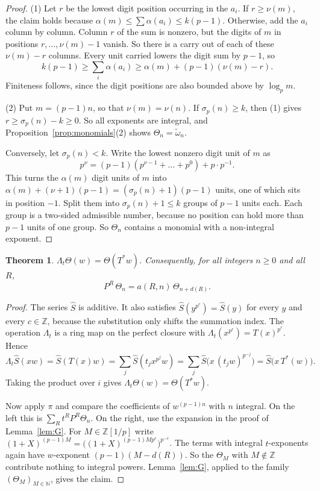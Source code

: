 \documentclass[11pt]{amsart}
\newtheorem{theorem}{Theorem}[section]
\theoremstyle{definition}
\theoremstyle{remark}
\newcommand{\wt}{\widetilde{\omega}}
\begin{document}
\begin{proof}
(1) Let $r$ be the lowest digit position occurring in the $a_i$.  If
$r\ge\nu(m)$, the claim holds because $\alpha(m)\le\sum\alpha(a_i)\le k(p-1)$.
Otherwise, add the $a_i$ column by column.  Column $r$ of the sum is nonzero,
but the digits of $m$ in positions $r,\dots,\nu(m)-1$ vanish.  So there is a
carry out of each of these $\nu(m)-r$ columns.  Every unit carried lowers the
digit sum by $p-1$, so
\[
  k(p-1)\ge\sum_i\alpha(a_i)\ge\alpha(m)+(p-1)(\nu(m)-r).
\]
Finiteness follows, since the digit positions are also bounded above by
$\log_pm$.

(2) Put $m=(p-1)n$, so that $\nu(m)=\nu(n)$.  If $\sigma_p(n)\ge k$, then (1)
gives $r\ge\sigma_p(n)-k\ge0$.  So all exponents are integral, and
Proposition~\ref{prop:monomials}(2) shows $\Theta_n=\wt_n$.

Conversely, let $\sigma_p(n)<k$.  Write the lowest nonzero digit unit of $m$ as
\[
  p^{\nu}=(p-1)(p^{\nu-1}+\dots+p^0)+p\cdot p^{-1}.
\]
This turns the $\alpha(m)$ digit units of $m$ into
$\alpha(m)+(\nu+1)(p-1)=(\sigma_p(n)+1)(p-1)$ units, one of which sits in
position $-1$.  Split them into $\sigma_p(n)+1\le k$ groups of $p-1$ units
each.  Each group is a two-sided admissible number, because no position can
hold more than $p-1$ units of one group.  So $\Theta_n$ contains a monomial
with a non-integral exponent.
\end{proof}

\begin{theorem}\label{thm:twoaction}
$\Lambda_t\Theta(w)=\Theta(T^*w)$.  Consequently, for all integers $n\ge0$
and all $R$,
\[
  P^R\,\Theta_n=a(R,n)\,\Theta_{n+d(R)} .
\]
\end{theorem}

\begin{proof}
The series $\widehat S$ is additive.  It also satisfies
$\widehat S(y^{p^c})=\widehat S(y)$ for every $y$ and every $c\in\mathbb{Z}$,
because the substitution only shifts the summation index.  The operation
$\Lambda_t$ is a ring map on the perfect closure with
$\Lambda_t(x^{p^r})=T(x)^{p^r}$.  Hence
\[
  \Lambda_t\widehat S(xw)=\widehat S(T(x)w)=\sum_j\widehat S(t_jx^{p^j}w)
  =\sum_j\widehat S\bigl(x\,(t_jw)^{p^{-j}}\bigr)=\widehat S\bigl(x\,T^*(w)\bigr).
\]
Taking the product over $i$ gives $\Lambda_t\Theta(w)=\Theta(T^*w)$.

Now apply $\pi$ and compare the coefficients of $w^{(p-1)n}$ with $n$
integral.  On the left this is $\sum_Rt^RP^R\Theta_n$.  On the right, use the
expansion in the proof of Lemma~\ref{lem:G}.  For $M\in\mathbb{Z}[1/p]$ write
$(1+X)^{(p-1)M}=\bigl((1+X)^{(p-1)Mp^e}\bigr)^{p^{-e}}$.  The terms with
integral $t$-exponents again have $w$-exponent $(p-1)(M-d(R))$.  So the
$\Theta_M$ with $M\notin\mathbb{Z}$ contribute nothing to integral powers.
Lemma~\ref{lem:G}, applied to the family $(\Theta_M)_{M\in\mathbb{N}}$, gives
the claim.
\end{proof}
\end{document}
